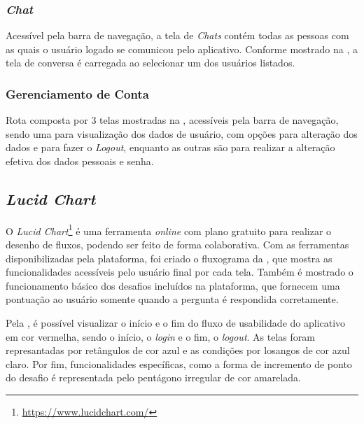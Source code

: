 \subsubsection{\textit{Chat}}

Acessível pela barra de navegação, a tela de \textit{Chats} contém todas as pessoas com as quais o usuário logado se comunicou pelo aplicativo. Conforme mostrado na , a tela de conversa é carregada ao selecionar um dos usuários listados.


\subsubsection{Gerenciamento de Conta}

Rota composta por 3 telas mostradas na , acessíveis pela barra de navegação, sendo uma para visualização dos dados de usuário, com opções para alteração dos dados e para fazer o \textit{Logout}, enquanto as outras são para realizar a alteração efetiva dos dados pessoais e senha.


\subsection{\textit{Lucid Chart}}

O \textit{Lucid Chart}\footnote{\url{https://www.lucidchart.com/}} é uma ferramenta \textit{online} com plano gratuito para realizar o desenho de fluxos, podendo ser feito de forma colaborativa. Com as ferramentas disponibilizadas pela plataforma, foi criado o fluxograma da , que mostra as funcionalidades acessíveis pelo usuário final por cada tela. Também é mostrado o funcionamento básico dos desafios incluídos na plataforma, que fornecem uma pontuação ao usuário somente quando a pergunta é respondida corretamente.


Pela , é possível visualizar o início e o fim do fluxo de usabilidade do aplicativo em cor vermelha, sendo o início, o \textit{login} e o fim, o \textit{logout}. As telas foram represantadas por retângulos de cor azul e as condições por losangos de cor azul claro. Por fim, funcionalidades específicas, como a forma de incremento de ponto do desafio é representada pelo pentágono irregular de cor amarelada.

